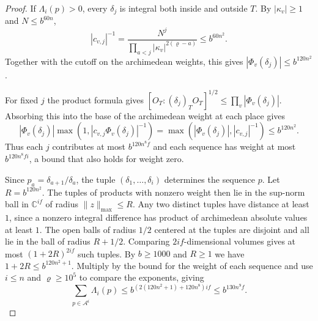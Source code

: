 \begin{proof}
If $\Lambda_i(p)>0$, every $\delta_j$ is integral both inside and outside $T$.
By $|\kappa_v|\ge1$ and $N\le b^{60n}$,
\[
 |c_{v,j}|^{-1}
 =\frac{N^j}{\prod_{a<j}|\kappa_v|^{2(\varrho-a)}}
 \le b^{60n^2}.
\]
Together with the cutoff on the archimedean weights, this gives $|\Phi_v(\delta_j)|\le b^{120n^2}$.

For fixed $j$ the product formula gives
$[O_T:(\delta_j)_TO_T]^{1/2}\le\prod_v|\Phi_v(\delta_j)|$.
Absorbing this into the base of the archimedean weight at each place gives
\[
 |\Phi_v(\delta_j)|\max(1,|c_{v,j}\Phi_v(\delta_j)|^{-1})
 =\max(|\Phi_v(\delta_j)|,|c_{v,j}|^{-1})
 \le b^{120n^2}.
\]
Thus each $j$ contributes at most $b^{120n^8 f}$ and each sequence has weight at most
$b^{120n^8fi}$, a bound that also holds for weight zero.

Since $p_a=\delta_{a+1}/\delta_a$, the tuple $(\delta_1,\dots,\delta_i)$ determines the sequence $p$.
Let $R=b^{120n^2}$. The tuples of products with nonzero weight then lie in the sup-norm ball in $\mathbb C^{if}$
of radius $\|z\|_{\max}\le R$. Any two distinct tuples have distance at least $1$,
since a nonzero integral difference has product of archimedean absolute values at least $1$.
The open balls of radius $1/2$ centered at the tuples are disjoint and all lie in the ball of radius $R+1/2$.
Comparing $2if$-dimensional volumes gives at most $(1+2R)^{2if}$ such tuples.
By $b\ge1000$ and $R\ge1$ we have $1+2R\le b^{120n^2+1}$.
Multiply by the bound for the weight of each sequence and use $i\le n$ and $\varrho\ge10^5$ to compare the exponents, giving
\[
 \sum_{p\in\mathcal A^i}\Lambda_i(p)
 \le b^{(2(120n^2+1)+120n^8)if}
 \le b^{130n^9 f}.
\]


\end{proof}
